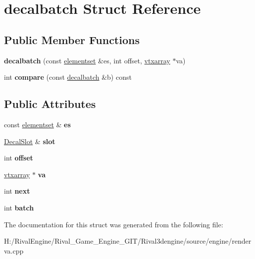 \hypertarget{structdecalbatch}{}\section{decalbatch Struct Reference}
\label{structdecalbatch}
\subsection*{Public Member Functions}
\begin{DoxyCompactItemize}
\item 
\mbox{\label{structdecalbatch_ae9dc4884b83948f7675f69b2dcf7a29e}} 
{\bfseries decalbatch} (const \hyperlink{structelementset}{elementset} \&es, int offset, \hyperlink{structvtxarray}{vtxarray} $\ast$va)
\item 
\mbox{\label{structdecalbatch_aa859444a701df954399ddc0f172fa830}} 
int {\bfseries compare} (const \hyperlink{structdecalbatch}{decalbatch} \&b) const
\end{DoxyCompactItemize}
\subsection*{Public Attributes}
\begin{DoxyCompactItemize}
\item 
\mbox{\label{structdecalbatch_aace50ea9908f4c82f1d732a640012965}} 
const \hyperlink{structelementset}{elementset} \& {\bfseries es}
\item 
\mbox{\label{structdecalbatch_af0ecebffb6181db506828de930e0471e}} 
\hyperlink{struct_decal_slot}{Decal\+Slot} \& {\bfseries slot}
\item 
\mbox{\label{structdecalbatch_a855f47422bdbaf7b903d7d5659f180ee}} 
int {\bfseries offset}
\item 
\mbox{\label{structdecalbatch_ab7b0be0021cfc41293c89e5b1894375c}} 
\hyperlink{structvtxarray}{vtxarray} $\ast$ {\bfseries va}
\item 
\mbox{\label{structdecalbatch_aeee5aa6e9b104269e95b0aa98e2718e3}} 
int {\bfseries next}
\item 
\mbox{\label{structdecalbatch_aa436ce54497590f95d034dff6058cc91}} 
int {\bfseries batch}
\end{DoxyCompactItemize}


The documentation for this struct was generated from the following file\+:\begin{DoxyCompactItemize}
\item 
H\+:/\+Rival\+Engine/\+Rival\+\_\+\+Game\+\_\+\+Engine\+\_\+\+G\+I\+T/\+Rival3dengine/source/engine/renderva.\+cpp\end{DoxyCompactItemize}
